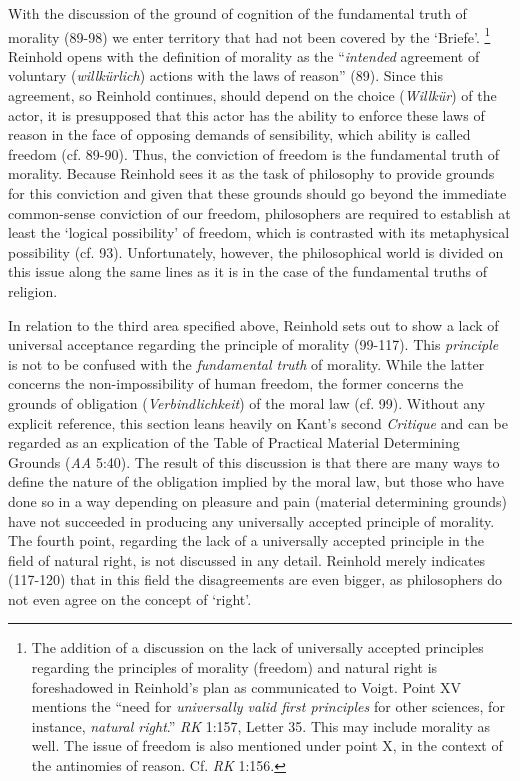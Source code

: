  With the discussion of the ground of cognition of the fundamental truth of morality (89{-}98) we enter territory that had not been covered by the `Briefe'. \footnote{ The addition of a discussion on the lack of universally accepted principles regarding the principles of morality (freedom) and natural right is foreshadowed in Reinhold's plan as communicated to Voigt. Point XV mentions the ``need for \textit{universally valid first principles} for other sciences, for instance, \textit{natural right}.'' \textit{RK} 1:157, Letter 35. This may include morality as well. The issue of freedom is also mentioned under point X, in the context of the antinomies of reason. Cf. \textit{RK} 1:156. } Reinhold opens with the definition of morality as the ``\textit{intended} agreement of voluntary (\textit{willk\"{u}rlich}) actions with the laws of reason'' (89). Since this agreement, so Reinhold continues, should depend on the choice (\textit{Willk\"{u}r}) of the actor, it is presupposed that this actor has the ability to enforce these laws of reason in the face of opposing demands of sensibility, which ability is called freedom (cf. 89{-}90). Thus, the conviction of freedom is the fundamental truth of morality. Because Reinhold sees it as the task of philosophy to provide grounds for this conviction and given that these grounds should go beyond the immediate common{-}sense conviction of our freedom, philosophers are required to establish at least the `logical possibility' of freedom, which is contrasted with its metaphysical possibility (cf. 93). Unfortunately, however, the philosophical world is divided on this issue along the same lines as it is in the case of the fundamental truths of religion.

 In relation to the third area specified above, Reinhold sets out to show a lack of universal acceptance regarding the principle of morality (99{-}117). This \textit{principle} is not to be confused with the \textit{fundamental truth} of morality. While the latter concerns the non{-}impossibility of human freedom, the former concerns the grounds of obligation (\textit{Verbindlichkeit}) of the moral law (cf. 99). Without any explicit reference, this section leans heavily on Kant's second \textit{Critique} and can be regarded as an explication of the Table of Practical Material Determining Grounds (\textit{AA} 5:40). The result of this discussion is that there are many ways to define the nature of the obligation implied by the moral law, but those who have done so in a way depending on pleasure and pain (material determining grounds) have not succeeded in producing any universally accepted principle of morality. The fourth point, regarding the lack of a universally accepted principle in the field of natural right, is not discussed in any detail. Reinhold merely indicates (117{-}120) that in this field the disagreements are even bigger, as philosophers do not even agree on the concept of `right'. 

